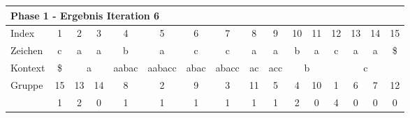 \begin{table}[H]
\centering
\begin{adjustbox}{max width=\textwidth}
\begin{tabular}{lccccccccccccccc}
\multicolumn{16}{l}{Phase 1 - Ergebnis Iteration 6}                                                                                                                                                                                                                                                                                                                                                                          \\ \hline
\multicolumn{1}{l|}{Index}   & 1                       & 2                         & 3                       & 4                                                  & 5                           & \cellcolor[HTML]{\green}6 & 7                          & 8                         & 9                         & 10 & 11                      & 12 & 13                        & 14                        & 15  \\
\multicolumn{1}{l|}{Zeichen} & c                       & a                         & a                       & b                                                  & a                           & c                         & c                          & a                         & a                         & b  & a                       & c  & a                         & a                         & \$  \\ \cline{1-16}
\multicolumn{1}{l|}{Kontext} & \multicolumn{1}{c|}{\$} & \multicolumn{2}{c|}{a}                              & \multicolumn{1}{c|}{\cellcolor[HTML]{\red}aabac} & \multicolumn{1}{c|}{aabacc} & \multicolumn{1}{c|}{abac} & \multicolumn{1}{c|}{abacc} & \multicolumn{1}{c|}{ac}   & \multicolumn{1}{c|}{acc}  & \multicolumn{2}{c|}{b}       & \multicolumn{4}{c}{c}                                            \\
\multicolumn{1}{l|}{Gruppe}      & \multicolumn{1}{c|}{15} & 13                        & \multicolumn{1}{c|}{14} & \multicolumn{1}{c|}{\cellcolor[HTML]{\red}8}     & \multicolumn{1}{c|}{2}      & \multicolumn{1}{c|}{9}    & \multicolumn{1}{c|}{3}     & \multicolumn{1}{c|}{11}   & \multicolumn{1}{c|}{5}    & 4  & \multicolumn{1}{c|}{10} & 1  & 6                         & 7                         & 12  \\
\multicolumn{1}{l|}{\gsize}   & \multicolumn{1}{c|}{1}  & \cellcolor[HTML]{\red}2 & \multicolumn{1}{c|}{0}  & \multicolumn{1}{c|}{\cellcolor[HTML]{\red}1}     & \multicolumn{1}{c|}{1}      & \multicolumn{1}{c|}{1}    & \multicolumn{1}{c|}{1}     & \multicolumn{1}{c|}{1}    & \multicolumn{1}{c|}{1}    & 2  & \multicolumn{1}{c|}{0}  & 4  & 0                         & 0                         & 0   \\

\end{tabular}
\end{adjustbox}
\end{table}
